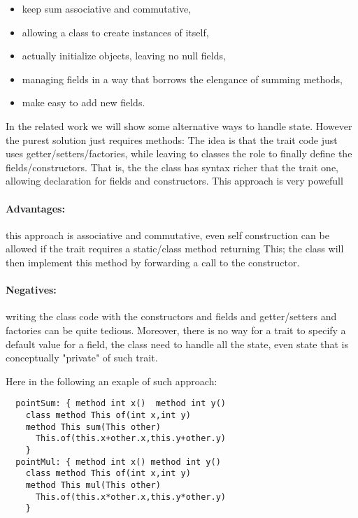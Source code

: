 \begin{itemize}
\item keep sum associative and commutative,
\item allowing a class to create instances of itself,
\item actually initialize objects, leaving no null fields,
\item managing fields in a way that borrows the elengance of summing methods,
\item make easy to add new fields.
\end{itemize}

In the related work we will show some alternative ways to handle state.
However the purest solution just requires methods:
  The idea is that
  the trait code just uses getter/setters/factories, while leaving
  to classes the role to finally define the fields/constructors.
  That is, the  the class has syntax richer that the trait one,
  allowing declaration for fields and constructors.
  This approach is very powefull~\cite{wang2016classless}
 
\paragraph*{Advantages:} 
this approach is associative and commutative, even self construction
  can be allowed if the trait requires a static/class method
  returning This; the class will then implement this method by forwarding
  a call to the constructor.
  
\paragraph*{Negatives:} writing the class code with the constructors and
   fields and getter/setters and factories can be quite tedious.
   Moreover, there is no way for a trait to specify a default value for a field,
   the class need to handle all the state, even state that is conceptually
   "private" of such trait.

Here in the following an exaple of such approach:

\begin{lstlisting}
  pointSum: { method int x()  method int y()
    class method This of(int x,int y)
    method This sum(This other)
      This.of(this.x+other.x,this.y+other.y)
    }
  pointMul: { method int x() method int y()
    class method This of(int x,int y)
    method This mul(This other)
      This.of(this.x*other.x,this.y*other.y)
    }
\end{lstlisting}

